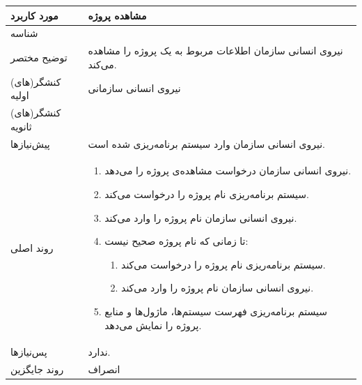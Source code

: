 \begin{table}[H]
	\centering
	\begin{tabular}{|p{3cm}|p{10cm}|}
		\hline
		
		مورد کاربرد & مشاهده پروژه  \\
		\hline
		
		شناسه & 
		\stepcounter{usecase_ID}
		
		\arabic{usecase_ID} \\
		\hline
		
		توضیح مختصر & نیروی انسانی سازمان اطلاعات مربوط به یک پروژه را مشاهده می‌کند. \\
		\hline
		
		کنشگر(های) اولیه & نیروی انسانی سازمانی \\
		\hline
		
		کنشگر(های) ثانویه &  \\
		\hline
		
		پیش‌نیازها & نیروی انسانی سازمان وارد سیستم برنامه‌ریزی شده است. \\
		\hline
		
		
		روند اصلی &
		\begin{enumerate}[topsep=0cm,leftmargin=0.5cm]
			
			\item نیروی انسانی سازمان درخواست مشاهده‌ی پروژه را می‌دهد. 
			\item سیستم برنامه‌ریزی نام پروژه را درخواست می‌کند. 
			\item نیروی انسانی سازمان نام پروژه را وارد می‌کند. 
			\item تا زمانی که نام پروژه صحیح نیست: 
			\begin{enumerate}[topsep=0cm,leftmargin=0.5cm]
				\item سیستم برنامه‌ریزی نام پروژه را درخواست می‌کند. 
				\item نیروی انسانی سازمان نام پروژه را وارد می‌کند.
			\end{enumerate}
			\item سیستم برنامه‌ریزی فهرست سیستم‌ها، ماژول‌ها و منابع پروژه را نمایش می‌دهد.
		\end{enumerate} \\
		\hline
		
		
		پس‌نیازها & ندارد. \\
		\hline
		
		روند جایگزین & انصراف \\
		\hline
		
	\end{tabular}
\end{table}


